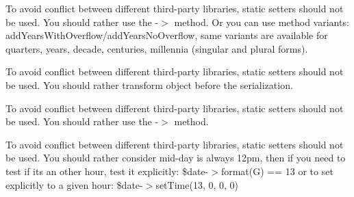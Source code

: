 \begin{DoxyRefList}
\item[Global \doxylink{interface_carbon_1_1_carbon_interface_a5805d7475fad3039fb8cad16e854b995}{Carbon\+Interface\+::reset\+Years\+Overflow} ()]\label{deprecated__deprecated000110}%
%
To avoid conflict between different third-\/party libraries, static setters should not be used. You should rather use the -\/\texorpdfstring{$>$}{>} method. Or you can use method variants\+: add\+Years\+With\+Overflow/add\+Years\+No\+Overflow, same variants are available for quarters, years, decade, centuries, millennia (singular and plural forms).  
\item[Global \doxylink{interface_carbon_1_1_carbon_interface_a97aba8c31678c3b6c1f050f43a2feb97}{Carbon\+Interface\+::serialize\+Using} (\$callback)]\label{deprecated__deprecated000111}%
%
To avoid conflict between different third-\/party libraries, static setters should not be used. You should rather transform  object before the serialization. 
\item[Global \doxylink{interface_carbon_1_1_carbon_interface_a336c5bd3a31e7bcb761ad819f4128cf9}{Carbon\+Interface\+::set\+Human\+Diff\+Options} (\$human\+Diff\+Options)]\label{deprecated__deprecated000112}%
%
To avoid conflict between different third-\/party libraries, static setters should not be used. You should rather use the -\/\texorpdfstring{$>$}{>} method.  
\item[Global \doxylink{interface_carbon_1_1_carbon_interface_a492cccea16f79a9ea5e0c9c380af49f8}{Carbon\+Interface\+::set\+Mid\+Day\+At} (\$hour)]\label{deprecated__deprecated000113}%
%
To avoid conflict between different third-\/party libraries, static setters should not be used. You should rather consider mid-\/day is always 12pm, then if you need to test if it\textquotesingle{}s an other hour, test it explicitly\+: \$date-\/\texorpdfstring{$>$}{>}format(\textquotesingle{}G\textquotesingle{}) == 13 or to set explicitly to a given hour\+: \$date-\/\texorpdfstring{$>$}{>}set\+Time(13, 0, 0, 0) 
\item[Global \doxylink{interface_carbon_1_1_carbon_interface_a7131525cb1e3f4d18949b4a3ac55113f}{Carbon\+Interface\+::set\+To\+String\+Format} (\$format)]\label{deprecated__deprecated000114}%

\end{DoxyRefList}
